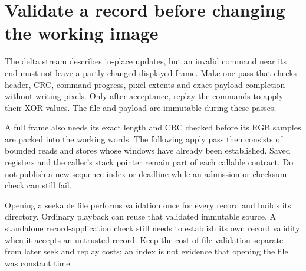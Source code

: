 \section{Validate a record before changing the working image}
The delta stream describes in-place updates, but an invalid command near its end
must not leave a partly changed displayed frame. Make one pass that checks header,
CRC, command progress, pixel extents and exact payload completion without writing
pixels. Only after acceptance, replay the commands to apply their XOR values.
The file and payload are immutable during these passes.

A full frame also needs its exact length and CRC checked before its RGB samples are
packed into the working words. The following apply pass then consists of bounded
reads and stores whose windows have already been established. Saved registers and
the caller's stack pointer remain part of each callable contract. Do not publish a
new sequence index or deadline while an admission or checksum check can still fail.

Opening a seekable file performs validation once for every record and builds its
directory. Ordinary playback can reuse that validated immutable source. A standalone
record-application check still needs to establish its own record validity when it
accepts an untrusted record. Keep the cost of file validation separate from later
seek and replay costs; an index is not evidence that opening the file was constant time.
